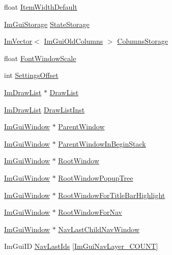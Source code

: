 \begin{DoxyCompactItemize}
\item 
float \hyperlink{structImGuiWindow_a5e6be361ee0c71a22a1ff68f6dbf09ff}{Item\+Width\+Default}
\item 
\hyperlink{structImGuiStorage}{Im\+Gui\+Storage} \hyperlink{structImGuiWindow_a2151ab67f2624bd606883ad346179486}{State\+Storage}
\item 
\hyperlink{structImVector}{Im\+Vector}$<$ \hyperlink{structImGuiOldColumns}{Im\+Gui\+Old\+Columns} $>$ \hyperlink{structImGuiWindow_adc3a0fa2c0f86108d6c5374617405bba}{Columns\+Storage}
\item 
float \hyperlink{structImGuiWindow_a566ce9268a466afbbec78532d5cfa3c9}{Font\+Window\+Scale}
\item 
int \hyperlink{structImGuiWindow_a040c6dacad197beb0cd02b8c9ce01d11}{Settings\+Offset}
\item 
\hyperlink{structImDrawList}{Im\+Draw\+List} $\ast$ \hyperlink{structImGuiWindow_a39de4668b09754136c6fd7ab89ab674a}{Draw\+List}
\item 
\hyperlink{structImDrawList}{Im\+Draw\+List} \hyperlink{structImGuiWindow_aa99947e76fbf897c02ce1de44c202031}{Draw\+List\+Inst}
\item 
\hyperlink{structImGuiWindow}{Im\+Gui\+Window} $\ast$ \hyperlink{structImGuiWindow_a5f0b37cb12fbeb3efe00d0cd826d5d65}{Parent\+Window}
\item 
\hyperlink{structImGuiWindow}{Im\+Gui\+Window} $\ast$ \hyperlink{structImGuiWindow_aa08b777f1426ceea4214ff1161819515}{Parent\+Window\+In\+Begin\+Stack}
\item 
\hyperlink{structImGuiWindow}{Im\+Gui\+Window} $\ast$ \hyperlink{structImGuiWindow_aef9281297b0993c8f1b7c1ff7987cb61}{Root\+Window}
\item 
\hyperlink{structImGuiWindow}{Im\+Gui\+Window} $\ast$ \hyperlink{structImGuiWindow_a5b5c4785c370996fbfe7929227ddae53}{Root\+Window\+Popup\+Tree}
\item 
\hyperlink{structImGuiWindow}{Im\+Gui\+Window} $\ast$ \hyperlink{structImGuiWindow_ae5d5c6637b63f35edc415162a5674c1e}{Root\+Window\+For\+Title\+Bar\+Highlight}
\item 
\hyperlink{structImGuiWindow}{Im\+Gui\+Window} $\ast$ \hyperlink{structImGuiWindow_a949a4aa260a21e8a8d2f65ffbe789712}{Root\+Window\+For\+Nav}
\item 
\hyperlink{structImGuiWindow}{Im\+Gui\+Window} $\ast$ \hyperlink{structImGuiWindow_a7255735a59782a09b4536e633e5153dd}{Nav\+Last\+Child\+Nav\+Window}
\item 
Im\+Gui\+ID \hyperlink{structImGuiWindow_a1ff0db084ee889ee5d0846ce4f3dfe97}{Nav\+Last\+Ids} \mbox{[}\hyperlink{imgui__internal_8h_afb412215b8327dc2c6af2c19fdca64c6a7c54ca28f0db8d5e808af0ec3290b05c}{Im\+Gui\+Nav\+Layer\+\_\+\+C\+O\+U\+NT}\mbox{]}

\end{DoxyCompactItemize}
